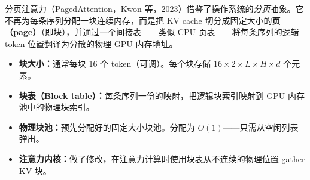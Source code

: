 分页注意力（PagedAttention，Kwon 等，2023）借鉴了操作系统的\emph{分页}抽象。它不再为每条序列分配一块连续内存，而是把 KV cache 切分成固定大小的\textbf{页（page）}（即块），并通过一个间接表——类似 CPU 页表——将每条序列的逻辑 token 位置翻译为分散的物理 GPU 内存地址。

\begin{keybox}
\begin{itemize}
  \item \textbf{块大小：}通常每块 16 个 token（可调）。每个块存储 $16 \times 2 \times L \times H \times d$ 个元素。
  \item \textbf{块表（Block table）：}每条序列一份的映射，把逻辑块索引映射到 GPU 内存池中的物理块索引。
  \item \textbf{物理块池：}预先分配好的固定大小块池。分配为 $O(1)$——只需从空闲列表弹出。
  \item \textbf{注意力内核：}做了修改，在注意力计算时使用块表从不连续的物理位置 gather KV 块。
\end{itemize}
\end{keybox}

